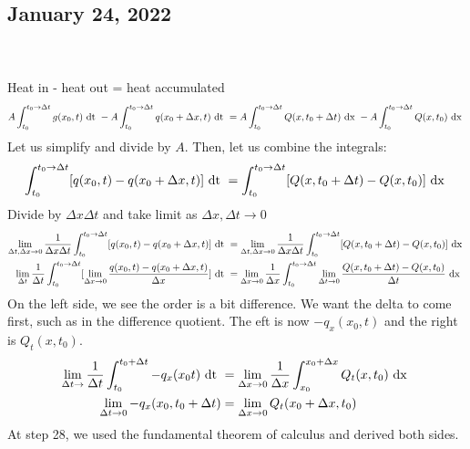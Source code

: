 \subsection*{January 24, 2022}
\\
\\
Heat in - heat out = heat accumulated
\begin{align}
  A \int^{t_0 \rightarrow \Delta t}_{t_0} g(x_0, t) \text{ dt } -
  A \int^{t_0 \rightarrow \Delta t}_{t_0} q(x_0 + \Delta x, t) \text{ dt } =
  A \int^{t_0 \rightarrow \Delta t}_{t_0} Q(x, t_0 + \Delta t) \text{ dx } -
  A \int^{t_0 \rightarrow \Delta t}_{t_0} Q(x, t_0) \text{ dx }
\end{align}
Let us simplify and divide by $A$. Then, let us combine the integrals:
\begin{align}
  \int^{t_0 \rightarrow \Delta t}_{t_0} [q(x_0, t) - q(x_0 + \Delta x, t)] \text{ dt } =
  \int^{t_0 \rightarrow \Delta t}_{t_0} [Q(x, t_0 + \Delta t) - Q(x, t_0)] \text{ dx }
\end{align}
Divide by $\Delta x \Delta t$ and take limit as $\Delta x, \Delta t \rightarrow 0$
\begin{align}
  \lim_{\Delta t, \Delta x \rightarrow 0} \frac{1}{\Delta x \Delta t}
  \int^{t_0 \rightarrow \Delta t}_{t_0} [q(x_0, t) - q(x_0 + \Delta x, t)] \text{ dt } & =
  \lim_{\Delta t, \Delta x \rightarrow 0} \frac{1}{\Delta x \Delta t}
  \int^{t_0 \rightarrow \Delta t}_{t_0} [Q(x, t_0 + \Delta t) - Q(x, t_0)] \text{ dx }\\
  \lim_{\Delta t} \frac{1}{\Delta t} \int^{t_0 \rightarrow \Delta t}_{t_0} [\lim_{\Delta x \rightarrow 0} \frac{q(x_0, t) - q(x_0 + \Delta x, t)}{\Delta x}] \text{ dt } & =
  \lim_{\Delta x \rightarrow 0} \frac{1}{\Delta x}
  \int^{t_0 \rightarrow \Delta t}_{t_0} \lim_{\Delta t \rightarrow 0} \frac
  {Q(x, t_0 + \Delta t) - Q(x, t_0)}{\Delta t} \text{ dx }
\end{align}
On the left side, we see the order is a bit difference. We want the delta to come first, such as in the difference quotient. The eft is now $-q_x(x_0, t)$ and the right is $Q_t(x, t_0)$.
\begin{align}
  \lim_{\Delta t \rightarrow} \frac{1}{\Delta t} \int^{t_0 + \Delta t}_{t_0} - q_x(x_0 t) \text{ dt } & =
  \lim_{\Delta x \rightarrow 0} \frac{1}{\Delta x} \int^{x_0 + \Delta x}_{x_0} Q_t(x, t_0) \text{ dx }\\
  \lim_{\Delta t \rightarrow 0} -q_x(x_0, t_0 + \Delta t) & = \lim_{\Delta x \rightarrow 0} Q_t(x_0 + \Delta x, t_0)
\end{align}
At step 28, we used the fundamental theorem of calculus and derived both sides.

